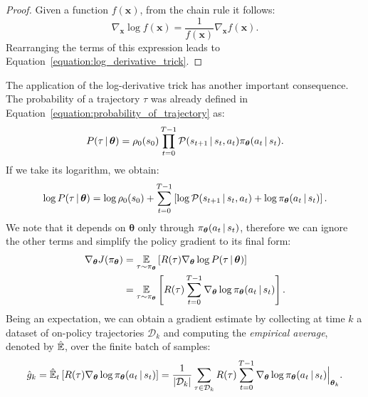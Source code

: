 \begin{proof}
    Given a function $f(\boldsymbol{x})$, from the chain rule it follows:
    \begin{equation*}
        \nabla_{\boldsymbol{x}} \log f(\boldsymbol{x}) = \frac{1}{f(\boldsymbol{x})} \nabla_{\boldsymbol{x}} f(\boldsymbol{x}) .
    \end{equation*}
    Rearranging the terms of this expression leads to Equation~\eqref{equation:log_derivative_trick}.
\end{proof}
%
The application of the log-derivative trick has another important consequence.
The probability of a trajectory $\tau$ was already defined in Equation~\eqref{equation:probability_of_trajectory} as:
%
\begin{equation*}
    P({\tau \operatorname{\mid} \boldsymbol{\theta}}) =
    \rho_0(s_0) \prod_{t=0}^{T-1} \mathcal{P}(s_{t+1} \operatorname{\mid} s_t, a_t) \pi_{\boldsymbol{\theta}}(a_t \operatorname{\mid} s_t) .
\end{equation*}
%
If we take its logarithm, we obtain:
%
\begin{equation*}
    \log P({\tau \operatorname{\mid} \boldsymbol{\theta}}) =
    \log \rho_0(s_0) + \sum_{t=0}^{T-1} \left[ \log \mathcal{P}(s_{t+1} \operatorname{\mid} s_t, a_t) + \log \pi_{\boldsymbol{\theta}}(a_t \operatorname{\mid} s_t) \right] .
\end{equation*}
%
We note that it depends on $\boldsymbol{\theta}$ only through $\pi_{\boldsymbol{\theta}}(a_t \operatorname{\mid} s_t)$, therefore we can ignore the other terms and simplify the policy gradient to its final form:
%
\begin{align}
    \label{equation:policy_gradient_final}
    \nabla_{\boldsymbol{\theta}} J(\pi_{\boldsymbol{\theta}})
    &= \operatorname*{\mathbb{E}}_{\tau \sim \pi_{\boldsymbol{\theta}}} \left[ R(\tau) \nabla_{\boldsymbol{\theta}} \log P(\tau \operatorname{\mid} \boldsymbol{\theta}) \right] \nonumber \\
    &= \operatorname*{\mathbb{E}}_{\tau \sim \pi_{\boldsymbol{\theta}}} \left[ R(\tau) \sum_{t=0}^{T-1} \nabla_{\boldsymbol{\theta}} \log \pi_{\boldsymbol{\theta}}(a_t \operatorname{\mid} s_t) \right] .
\end{align}
%
Being an expectation, we can obtain a gradient estimate by collecting at time $k$ a dataset of on-policy trajectories $\mathcal{D}_k$ and computing the \emph{empirical average}, denoted by $\hat{\operatorname*{\mathbb{E}}}$, over the finite batch of samples:
\begin{equation}
    \label{equation:policy_gradient_estimate_}
    \hat{g}_k
    = \hat{\operatorname*{\mathbb{E}}}_t \left[ R(\tau) \nabla_{\boldsymbol{\theta}} \log \pi_{\boldsymbol{\theta}}(a_t \operatorname{\mid} s_t) \right]
    = \frac{1}{\abs{\mathcal{D}_k}} \sum_{\tau \in \mathcal{D}_k} R(\tau) \sum_{t=0}^{T-1} \nabla_{\boldsymbol{\theta}} \log \pi_{\boldsymbol{\theta}}(a_t \operatorname{\mid} s_t)\Bigr|_{\substack{\boldsymbol{\theta}_k}} .
\end{equation}
